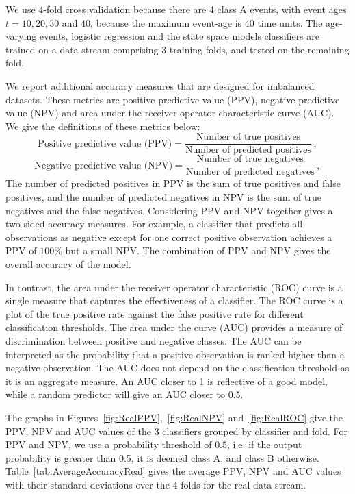 \documentclass[a4paper,11pt]{article}
\begin{document}
We use $4$-fold cross validation because there are 4 class A events, with event ages $t = 10, 20, 30$ and $40$, because the maximum event-age is $40$ time units. The age-varying events, logistic regression and the state space models classifiers are trained on a data stream comprising 3 training folds, and tested on the remaining fold.

We report additional accuracy measures that are designed for imbalanced datasets. These metrics are positive predictive value (PPV), negative predictive value (NPV) and area under the receiver operator characteristic curve (AUC). We give the definitions of these metrics below:
$$
  \text{Positive predictive value (PPV)} = \frac{ \text{Number of true positives} }{ \text{Number of predicted positives} } \, ,
$$
$$
  \text{Negative predictive value (NPV)} = \frac{ \text{Number of true negatives} }{ \text{Number of predicted negatives} } \, ,
$$
The number of predicted positives in PPV is the sum of true positives and false positives, and the number of predicted negatives in NPV is the sum of true negatives and the false negatives. Considering PPV and NPV together gives a two-sided accuracy measures. For example, a classifier that predicts all observations as negative except for one correct positive observation achieves a PPV of $100\%$ but a small NPV\@. The combination of PPV and NPV gives the overall accuracy of the model.

In contrast, the area under the receiver operator characteristic (ROC) curve is a single measure that captures the effectiveness of a classifier. The ROC curve is a plot of the true positive rate against the false positive rate for different classification thresholds. The area under the curve (AUC) provides a measure of discrimination between positive and negative classes. The AUC can be interpreted as the probability that a positive observation is ranked higher than a negative observation. The AUC does not depend on the classification threshold as it is an aggregate measure. An AUC closer to 1 is reflective of a good model, while a random predictor will give an AUC closer to 0.5.

The graphs in Figures~\ref{fig:RealPPV},~\ref{fig:RealNPV} and~\ref{fig:RealROC} give the PPV, NPV and AUC values of the 3 classifiers grouped by classifier and fold. For PPV and NPV, we use a probability threshold of $0.5$, i.e. if the output probability is greater than 0.5, it is deemed class A, and class B otherwise.  Table~\ref{tab:AverageAccuracyReal} gives the average PPV, NPV and AUC values with their standard deviations over the $4$-folds for the real data stream.
\end{document}
